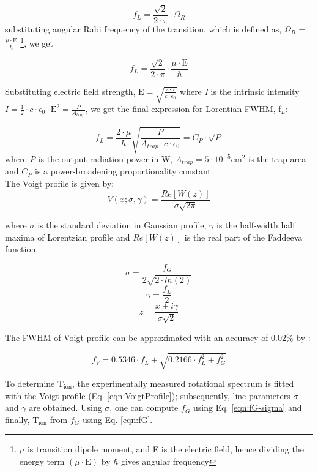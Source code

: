 \[ f_L = \frac{\sqrt{2}}{2 \cdot \pi} \cdot \Omega _R \]
substituting angular Rabi frequency of the transition, which is defined as, $\Omega _R$ = \( \frac{\mu \cdot \text{E}}{\hbar} \) \footnote{$\mu$ is transition dipole moment, and E is the electric field, hence dividing the energy term $(\mu \cdot \text{E})$ by $\hbar$ gives angular frequency}, we get

\[ f_L = \frac{\sqrt{2}}{2 \cdot \pi} \cdot \frac{\mu \cdot \text{E}}{\hbar} \]

Substituting electric field strength, 
\( \text{E} = \sqrt{\frac{2\cdot I}{c \cdot \epsilon _0}} \)
where \emph{I} is the intrinsic intensity 
\( I = \frac{1}{2} \cdot c \cdot \epsilon _0 \cdot \text{E}^2 = \frac{P}{A_{trap}} \), 
we get the final expression for Lorentian FWHM, f$_L$:

\begin{equation}
    f_L = \frac{2\cdot \mu}{h} \sqrt{\frac{P}{A_{trap} \cdot c \cdot \epsilon _0 }} = C_P \cdot \sqrt{P}
    \label{eqn:fL}
\end{equation}
where \emph{P} is the output radiation power in W, $A_{trap} = 5 \cdot 10^{-5} $cm$^2$ is the trap area and $C_P$ is a power-broadening proportionality constant.\\

The Voigt profile is given by: 
\begin{equation}
    V(x; \sigma, \gamma) = \frac{Re[W(z)]}{\sigma \sqrt{2\pi}}
    \label{eqn:VoigtProfile}
\end{equation}

where $\sigma$ is the standard deviation in Gaussian profile, $\gamma$ is the half-width half maxima of Lorentzian profile and $Re[W(z)]$ is the real part of the Faddeeva function.

\begin{equation}
    \sigma = \frac{f_G}{2\sqrt{2\cdot ln(2)}}
    \label{eqn:fG-sigma}
\end{equation}
\begin{equation}
    \gamma = \frac{f_L}{2}
    \label{eqn:fL-gamma}
\end{equation}
\[ z = \frac{x + i\gamma}{\sigma \sqrt{2}} \]

The FWHM of Voigt profile can be approximated  with an accuracy of 0.02\% by \cite{olivero_empirical_1977}:

\begin{equation}
    f_V = 0.5346 \cdot f_L + \sqrt{0.2166 \cdot f_L^2 + f_G^2}
    \label{eqn:fV}
\end{equation}

To determine T$_{\text{ion}}$, the experimentally measured rotational spectrum is fitted with the Voigt profile (Eq. \ref{eqn:VoigtProfile}); subsequently, line parameters $\sigma$ and $\gamma$ are obtained. Using $\sigma$, one can compute $f_G$ using Eq. \ref{eqn:fG-sigma} and finally, T$_{\text{ion}}$ from $f_G$ using Eq. \ref{eqn:fG}.
